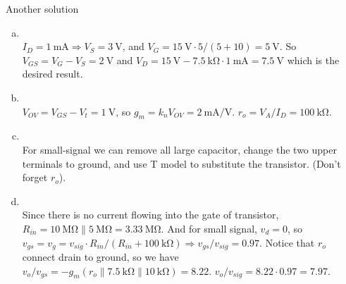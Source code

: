 \documentclass[12pt, a4paper]{article}
\begin{document}
\begin{enumerate}[(a)]
\end{enumerate}

Another solution \\
\begin{enumerate}[(a)]
  \item \Ans \\$I_D = \SI{1}{\mA} \Rightarrow V_S = \SI{3}{\V}$, and $V_G = \SI{15}{\V}
    \cdot 5/(5+10) = \SI{5}{\V}$. So $V_{GS} = V_G - V_S = \SI{2}{\V}$ and
    $V_D = \SI{15}{\V} - \SI{7.5}{\kohm} \cdot \SI{1}{\mA} = \SI{7.5}{\V}$
    which is the desired result.
  \item \Ans \\
    $V_{OV} = V_{GS} - V_t = \SI{1}{\V}$, so $g_m = k_n V_{OV} = \SI{2}{\mA/\V}$.
    $r_o = V_A / I_D = \SI{100}{\kohm}$.
  \item \Ans \\
    For small-signal we can remove all large capacitor, change the two upper
    terminals to ground, and use T model to substitute the transistor.
    (Don't forget $r_o$).
  \item \Ans \\
    Since there is no current flowing into the gate of transistor, 
    $R_{in} = \SI{10}{\mega\ohm} \parallel \SI{5}{\mega\ohm} = \SI{3.33}{\mega\ohm}$.
    And for small signal, $v_d = 0$, so $v_{gs} = v_g = v_{sig} \cdot
    R_{in} / (R_{in} + \SI{100}{\kohm}) \Rightarrow v_{gs}/v_{sig} = 0.97$.
    Notice that $r_o$ connect drain to ground, so we have $v_o/v_{gs} =
    -g_m (r_o \parallel \SI{7.5}{\kohm} \parallel \SI{10}{\kohm}) = 8.22$.
    $v_o / v_{sig} = 8.22 \cdot 0.97 = 7.97$.
\end{enumerate}

\end{document}
